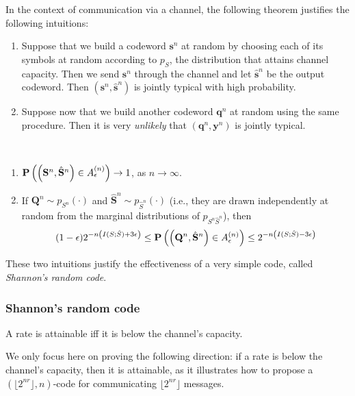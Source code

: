 In the context of communication via a channel, the following theorem justifies the following intuitions:

\begin{enumerate}
\item Suppose that we build a codeword $\mathbf{s}^n$ at random by choosing each of its symbols at random according to $p_S$, the distribution that attains channel capacity. Then we send $\mathbf{s}^n$ through the channel and let $\hat{\mathbf{s}}^n$ be the output codeword. Then $(\mathbf{s}^n, \hat{\mathbf{s}}^n)$ is jointly typical with high probability.
\item Suppose now that we build another codeword ${\mathbf{q}}^n$ at random using the same procedure. Then it is very \emph{unlikely} that $({\mathbf{q}}^n, \mathbf{y}^n)$ is jointly typical.
\end{enumerate}

\begin{theorem}\mbox{  }
\begin{enumerate}
\item $\mathbf{P}\left(\left(\mathbf{S}^n, \hat{\mathbf{S}}^n\right) \in A^{(n)}_{\epsilon}\right) \to 1$, as $n \to \infty$.
\item If $\mathbf{Q}^n \sim p_{S^n}(\cdot)$ and $\hat{\mathbf{S}}^n \sim p_{\hat{S}^n}(\cdot)$ (i.e., they are drawn independently at random from the marginal distributions of $p_{S^n\hat{S}^n}$), then
%
$$(1-\epsilon)2^{-n\left(I(S;\hat{S}) + 3\epsilon\right)} \leq \mathbf{P}\left(\left({\mathbf{Q}}^n, \hat{\mathbf{S}}^n\right) \in A^{(n)}_{\epsilon}\right) \leq 2^{-n\left(I(S;\hat{S}) - 3\epsilon\right)}$$
%
\end{enumerate}
\label{thm:joint_typical}
\end{theorem}

These two intuitions justify the effectiveness of a very simple code, called \emph{Shannon's random code}. 

\subsubsection*{Shannon's random code}

\begin{theorem}
A rate is attainable iff it is below the channel's capacity.
\end{theorem}

We only focus here on proving the following direction: if a rate is below the channel's capacity, then it is attainable, as it illustrates how to propose a $(\lfloor 2^{nr} \rfloor, n)$-code for communicating $\lfloor 2^{nr} \rfloor$ messages.

